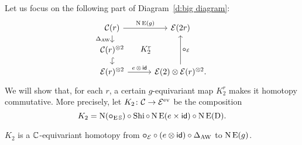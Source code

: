 Let us focus on the following part of Diagram~\eqref{d:big diagram}:
\begin{equation*}
	\begin{tikzcd}[row sep=small]
		\cC(r)
		\arrow[r,"\chains\EE(g)"]
		\arrow[d,"\Delta_{\AW}"']
		\arrow[ddr,phantom,"K_2^r",shift left=0pt]
		&[5pt] \BE(2r)
		\\
		\cC(r)^{\ot 2}
		\arrow[d,hook] & \\
		\BE(r)^{\ot 2}
		\arrow[r,"e\, \ot\, \id"]
		& \BE(2) \ot \BE(r)^{\ot 2}.
		\arrow[uu,"\bcomp_\BE"']
	\end{tikzcd}
\end{equation*}
We will show that, for each $r$, a certain $g$-equivariant map $K_2^r$ makes it homotopy commutative.
More precisely, let $K_2 \colon \mathcal{C} \to \mathcal{E}^{\mathrm{ev}}$ be the composition
\[
K_2 = \operatorname{N}(\bm{\mathbin{\circ}}_{\operatorname{E}\mathbb{S}}) \mathbin{\circ} \operatorname{Shi} \mathbin{\circ} \operatorname{N}\operatorname{E}(e \times \mathsf{id}) \mathbin{\circ} \operatorname{N}\operatorname{E}(\mathrm{D}).
\]

\begin{lemma}\label{l:K2}
	$K_2$ is a $\mathbb{C}$-equivariant homotopy from $\bm{\mathbin{\circ}}_{\mathcal{E}} \mathbin{\circ} (e \otimes \mathsf{id}) \mathbin{\circ} \Delta_{\operatorname{AW}}$ to $\operatorname{N}\operatorname{E}(g)$.
\end{lemma}

